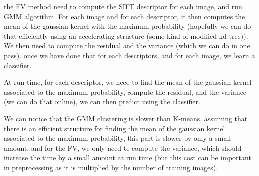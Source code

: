 \documentclass{article}
\begin{document}
the FV method need to compute the SIFT descriptor for each image, and
run GMM algorithm. For each image and for each descriptor, it then
computes the mean of the gaussian kernel with the maximum probability
(hopefully we can do that efficiently using an accelerating structure
(some kind of modified kd-tree)). We then need to compute the residual
and the variance (which we can do in one pass). once we have done that
for each descriptors, and for each image, we learn a classifier.

At run time, for each descriptor, we need to find the mean of the
gaussian kernel associated to the maximum probability, compute the
residual, and the variance (we can do that online), we can then
predict using the classifier.

We can notice that the GMM clustering is slower than K-means, assuming
that there is an efficient structure for finding the mean of the
gaussian kernel associated to the maximum probability, this part is
slower by only a small amount, and for the FV, we only need to compute
the variance, which should increase the time by a small amount at run
time (but this cost can be important in preprocessing as it is multiplied
by the number of training images).

\end{document}
